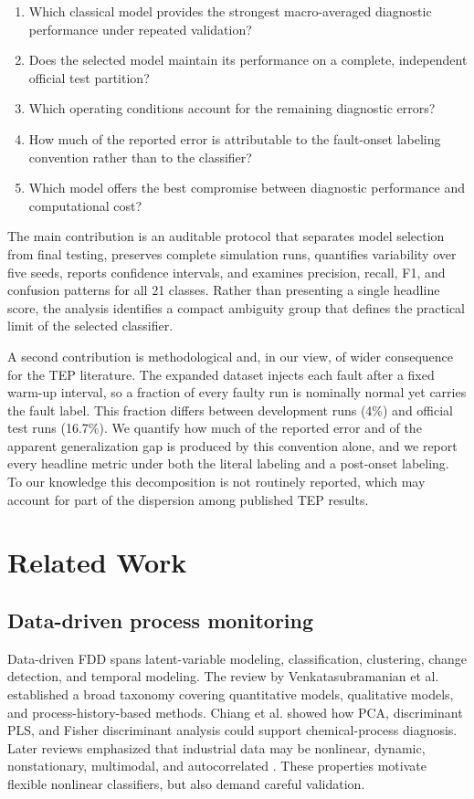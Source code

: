 \documentclass[10pt,twocolumn,a4paper]{article}
\begin{document}
\begin{enumerate}
  \item Which classical model provides the strongest macro-averaged diagnostic
  performance under repeated validation?
  \item Does the selected model maintain its performance on a complete,
  independent official test partition?
  \item Which operating conditions account for the remaining diagnostic errors?
  \item How much of the reported error is attributable to the fault-onset
  labeling convention rather than to the classifier?
  \item Which model offers the best compromise between diagnostic performance
  and computational cost?
\end{enumerate}

The main contribution is an auditable protocol that separates model selection
from final testing, preserves complete simulation runs, quantifies variability
over five seeds, reports confidence intervals, and examines precision, recall,
F1, and confusion patterns for all 21 classes. Rather than presenting a single
headline score, the analysis identifies a compact ambiguity group that defines
the practical limit of the selected classifier.

A second contribution is methodological and, in our view, of wider consequence
for the TEP literature. The expanded dataset injects each fault after a fixed
warm-up interval, so a fraction of every faulty run is nominally normal yet
carries the fault label. This fraction differs between development runs (4\%)
and official test runs (16.7\%). We quantify how much of the reported error and
of the apparent generalization gap is produced by this convention alone, and we
report every headline metric under both the literal labeling and a post-onset
labeling. To our knowledge this decomposition is not routinely reported, which
may account for part of the dispersion among published TEP results.

\section{Related Work}

\subsection{Data-driven process monitoring}

Data-driven FDD spans latent-variable modeling, classification, clustering,
change detection, and temporal modeling. The review by Venkatasubramanian et
al. \cite{venkatasubramanian2003review} established a broad taxonomy covering
quantitative models, qualitative models, and process-history-based methods.
Chiang et al. \cite{chiang2001book, chiang2000discriminant} showed how PCA,
discriminant PLS, and Fisher discriminant analysis could support chemical-process
diagnosis. Later reviews emphasized that industrial data may be nonlinear,
dynamic, nonstationary, multimodal, and autocorrelated
\cite{yin2014review,ji2022review}. These properties motivate flexible nonlinear
classifiers, but also demand careful validation.
\end{document}
